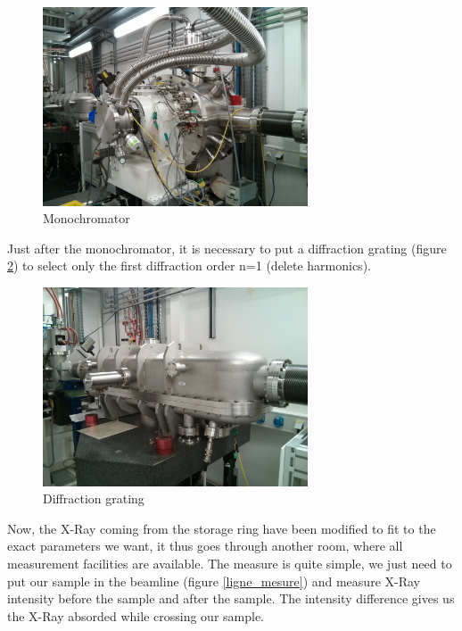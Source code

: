 \documentclass[11pt,a4paper,oneside]{report}
\begin{document}
\begin{figure}[H]
    \begin{center}
        \includegraphics[width=0.7\textwidth]{Images/IMG_20151210_202721.jpg}
        \caption{Monochromator}
        \label{monochromateur}
    \end{center}
\end{figure}


Just after the monochromator, it is necessary to put a diffraction grating (figure \ref{Reseau_diffract}) to select only the first diffraction order n=1 (delete harmonics).

\begin{figure}[H]
    \begin{center}
        \includegraphics[width=0.7\textwidth]{Images/IMG_20151210_202740.jpg}
        \caption{Diffraction grating}
        \label{Reseau_diffract}
    \end{center}
\end{figure}


Now, the X-Ray coming from the storage ring have been modified to fit to the exact parameters we want, it thus goes through another room, where all measurement facilities are available. The measure is quite simple, we just need to put our sample in the beamline (figure \ref{ligne_mesure}) and measure X-Ray intensity before the sample and after the sample. The intensity difference gives us the X-Ray absorded while crossing our sample.
\end{document}
